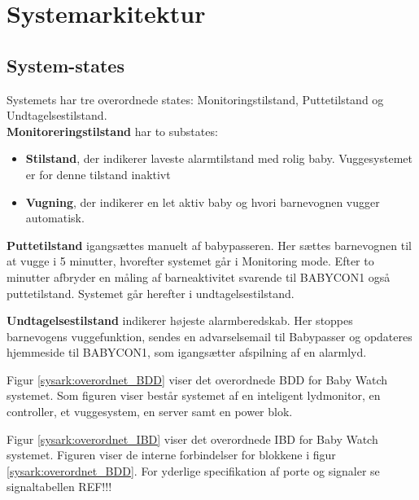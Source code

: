 \section{Systemarkitektur}

\subsection{System-states}


Systemets har tre overordnede states: Monitoringstilstand, Puttetilstand og Undtagelsestilstand. \\\textbf{Monitoreringstilstand} har to substates: 
\begin{itemize}
	\item \textbf{Stilstand}, der indikerer laveste alarmtilstand med rolig baby. Vuggesystemet er for denne tilstand inaktivt
	\item \textbf{Vugning}, der indikerer en let aktiv baby og hvori barnevognen vugger automatisk.
\end{itemize}

\textbf{Puttetilstand} igangsættes manuelt af babypasseren. Her sættes barnevognen til at vugge i 5 minutter, hvorefter systemet går i Monitoring mode. Efter to minutter afbryder en måling af barneaktivitet svarende til BABYCON1 også puttetilstand. Systemet går herefter i undtagelsestilstand.

\textbf{Undtagelsestilstand} indikerer højeste alarmberedskab. Her stoppes barnevogens vuggefunktion, sendes en advarselsemail til Babypasser og opdateres hjemmeside til BABYCON1, som igangsætter afspilning af en alarmlyd. 

Figur \ref{sysark:overordnet_BDD} viser det overordnede BDD for Baby Watch systemet. Som figuren viser består systemet af en inteligent lydmonitor, en controller, et vuggesystem, en server samt en power blok. 


Figur \ref{sysark:overordnet_IBD} viser det overordnede IBD for Baby Watch systemet.  Figuren viser de interne forbindelser for blokkene i figur \ref{sysark:overordnet_BDD}. For yderlige specifikation af porte og signaler se signaltabellen REF!!!